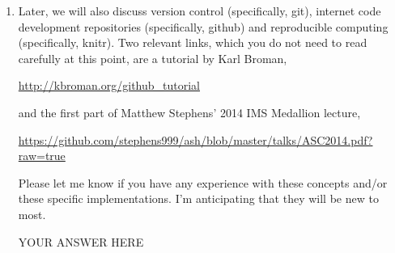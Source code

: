\documentclass[12pt]{article}
\begin{document}
\begin{enumerate}
\item Later, we will also discuss version control (specifically, git), internet code development repositories (specifically, github) and reproducible computing (specifically, knitr).  Two relevant links, which you do not need to read carefully at this point, are a tutorial by Karl Broman,

\url{http://kbroman.org/github_tutorial} 

and the first part of Matthew Stephens' 2014 IMS Medallion lecture,

\url{https://github.com/stephens999/ash/blob/master/talks/ASC2014.pdf?raw=true}

Please let me know if you have any experience with these concepts and/or these specific implementations. I'm anticipating that they will be new to most.

YOUR ANSWER HERE

\end{enumerate}
\end{document}
